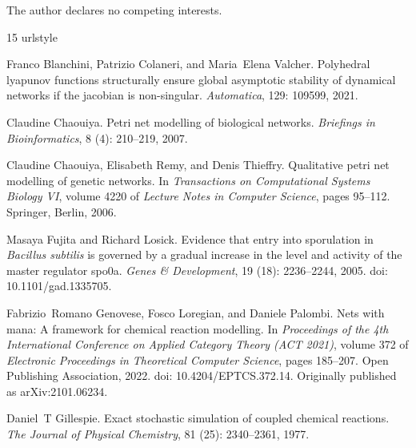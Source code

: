 \documentclass[twocolumn,11pt]{article}
\begin{document}
\vspace{3pt}
\noindent The author declares no competing interests.

\balance  %

\begin{thebibliography}{15}
\providecommand{\natexlab}[1]{#1}
\providecommand{\url}[1]{\texttt{#1}}
\expandafter\ifx\csname urlstyle\endcsname\relax
  \providecommand{\doi}[1]{doi: #1}\else
  \providecommand{\doi}{doi: \begingroup \urlstyle{rm}\Url}\fi

Franco Blanchini, Patrizio Colaneri, and Maria~Elena Valcher.
\newblock Polyhedral lyapunov functions structurally ensure global asymptotic
  stability of dynamical networks if the jacobian is non-singular.
\newblock \emph{Automatica}, 129: 109599, 2021.

Claudine Chaouiya.
\newblock Petri net modelling of biological networks.
\newblock \emph{Briefings in Bioinformatics}, 8 (4):
  210--219, 2007.

Claudine Chaouiya, Elisabeth Remy, and Denis Thieffry.
\newblock Qualitative petri net modelling of genetic networks.
\newblock In \emph{Transactions on Computational Systems Biology VI}, volume
  4220 of \emph{Lecture Notes in Computer Science}, pages 95--112. Springer,
  Berlin, 2006.

Masaya Fujita and Richard Losick.
\newblock Evidence that entry into sporulation in \textit{Bacillus subtilis} is
  governed by a gradual increase in the level and activity of the master
  regulator spo0a.
\newblock \emph{Genes \& Development}, 19 (18): 2236--2244,
  2005.
\newblock \doi{10.1101/gad.1335705}.

Fabrizio~Romano Genovese, Fosco Loregian, and Daniele Palombi.
\newblock Nets with mana: A framework for chemical reaction modelling.
\newblock In \emph{Proceedings of the 4th International Conference on Applied
  Category Theory (ACT 2021)}, volume 372 of \emph{Electronic Proceedings in
  Theoretical Computer Science}, pages 185--207. Open Publishing Association,
  2022.
\newblock \doi{10.4204/EPTCS.372.14}.
\newblock Originally published as arXiv:2101.06234.

Daniel~T Gillespie.
\newblock Exact stochastic simulation of coupled chemical reactions.
\newblock \emph{The Journal of Physical Chemistry}, 81 (25):
  2340--2361, 1977.


\end{thebibliography}
\end{document}
